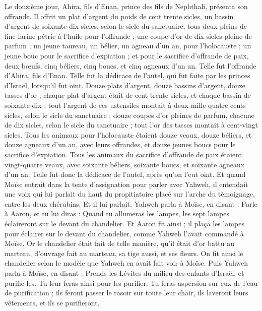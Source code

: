 \begin{multicols}{2}
Le douzième jour, Ahira, fils d'Enan, prince des fils de Nephthali, présenta son offrande.
Il offrit un plat d'argent du poids de cent trente sicles, un bassin d'argent de soixante-dix sicles, selon le sicle du sanctuaire, tous deux pleins de fine farine pétrie à l'huile pour l'offrande ;
une coupe d'or de dix sicles pleine de parfum ;
un jeune taureau, un bélier, un agneau d'un an, pour l'holocauste ;
un jeune bouc pour le sacrifice d'expiation ;
et pour le sacrifice d'offrande de paix, deux bœufs, cinq béliers, cinq boucs, et cinq agneaux d'un an. Telle fut l'offrande d'Ahira, fils d'Enan.
Telle fut la dédicace de l'autel, qui fut faite par les princes d'Israël, lorsqu'il fut oint. Douze plats d'argent, douze bassins d'argent, douze tasses d'or ;
chaque plat d'argent était de cent trente sicles, et chaque bassin de soixante-dix ; tout l'argent de ces ustensiles montait à deux mille quatre cents sicles, selon le sicle du sanctuaire ;
douze coupes d'or pleines de parfum, chacune de dix sicles, selon le sicle du sanctuaire ; tout l'or des tasses montait à cent-vingt sicles.
Tous les animaux pour l'holocauste étaient douze veaux, douze béliers, et douze agneaux d'un an, avec leurs offrandes, et douze jeunes boucs pour le sacrifice d'expiation.
Tous les animaux du sacrifice d'offrande de paix étaient vingt-quatre veaux, avec soixante béliers, soixante boucs, et soixante agneaux d'un an. Telle fut donc la dédicace de l'autel, après qu'on l'eut oint.
Et quand Moïse entrait dans la tente d'assignation pour parler avec Yahweh, il entendait une voix qui lui parlait du haut du propitiatoire placé sur l'arche du témoignage, entre les deux chérubins. Et il lui parlait.
\VerseOne{}Yahweh parla à Moïse, en disant :
Parle à Aaron, et tu lui diras : Quand tu allumeras les lampes, les sept lampes éclaireront sur le devant du chandelier.
Et Aaron fit ainsi ; il plaça les lampes pour éclairer sur le devant du chandelier, comme Yahweh l'avait commandé à Moïse.
Or le chandelier était fait de telle manière, qu'il était d'or battu au marteau, d'ouvrage fait au marteau, sa tige aussi, et ses fleurs. On fit ainsi le chandelier selon le modèle que Yahweh en avait fait voir à Moïse.
Puis Yahweh parla à Moïse, en disant :
Prends les Lévites du milieu des enfants d'Israël, et purifie-les.
 Tu leur feras ainsi pour les purifier. Tu feras aspersion sur eux de l'eau de purification ; ils feront passer le rasoir sur toute leur chair, ils laveront leurs vêtements, et ils se purifieront.

\end{multicols}
